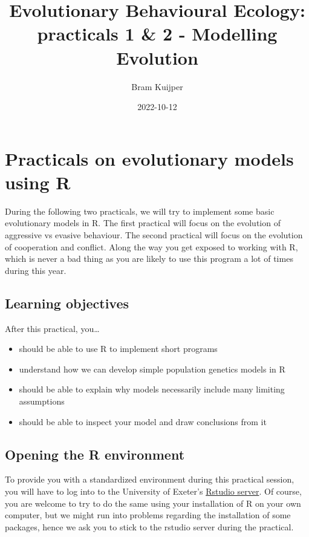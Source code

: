 \documentclass[
]{book}
\title{Evolutionary Behavioural Ecology: practicals 1 \& 2 - Modelling Evolution}
\author{Bram Kuijper}
\date{2022-10-12}
\providecommand{\tightlist}{%
  \setlength{\itemsep}{0pt}\setlength{\parskip}{0pt}}
\begin{document}
\maketitle

{
\setcounter{tocdepth}{1}
\tableofcontents
}
\hypertarget{practicals-on-evolutionary-models-using-r}{%
\chapter{Practicals on evolutionary models using R}\label{practicals-on-evolutionary-models-using-r}}

During the following two practicals, we will try to implement some basic evolutionary models in R. The first practical will focus on the evolution of aggressive vs evasive behaviour. The second practical will focus on the evolution of cooperation and conflict. Along the way you get exposed to working with R, which is never a bad thing as you are likely to use this program a lot of times during this year.

\hypertarget{learning-objectives}{%
\section{Learning objectives}\label{learning-objectives}}

After this practical, you\ldots{}

\begin{itemize}
\tightlist
\item
  should be able to use R to implement short programs
\item
  understand how we can develop simple population genetics models in R
\item
  should be able to explain why models necessarily include many limiting assumptions
\item
  should be able to inspect your model and draw conclusions from it
\end{itemize}

\hypertarget{opening-the-r-environment}{%
\section{Opening the R environment}\label{opening-the-r-environment}}

To provide you with a standardized environment during this practical session, you will have to log into to the University of Exeter's \href{https://rstudio01.cles.ex.ac.uk}{Rstudio server}. Of course, you are welcome to try to do the same using your installation of R on your own computer, but we might run into problems regarding the installation of some packages, hence we ask you to stick to the rstudio server during the practical.
\end{document}

